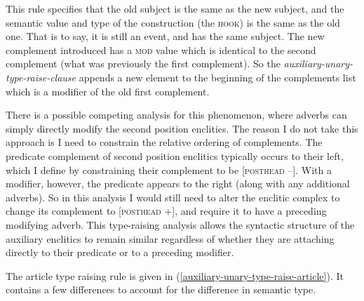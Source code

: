 \begin{singlespacing}
\ex \label{auxiliary-unary-type-raise-clause}
\xe
\end{singlespacing}

This rule specifies that the old subject is the same as the new subject, and the semantic value and type of the construction (the \textsc{hook}) is the same as the old one. That is to say, it is still an event, and has the same subject. The new complement introduced has a \textsc{mod} value which is identical to the second complement (what was previously the first complement). So the {\textit{auxiliary-unary-type-raise-clause}} appends a new element to the beginning of the complements list which is a modifier of the old first complement.

There is a possible competing analysis for this phenomenon, where adverbs can simply directly modify the second position enclitics. The reason I do not take this approach is I need to constrain the relative ordering of complements. The predicate complement of second position enclitics typically occurs to their left, which I define by constraining their complement to be [\textsc{posthead} --]. With a modifier, however, the predicate appears to the right (along with any additional adverbs). So in this analysis I would still need to alter the enclitic complex to change its complement to [\textsc{posthead} +], and require it to have a preceding modifying adverb. This type-raising analysis allows the syntactic structure of the auxiliary enclitics to remain similar regardless of whether they are attaching directly to their predicate or to a preceding modifier.

The article type raising rule is given in (\ref{auxiliary-unary-type-raise-article}). It contains a few differences to account for the difference in semantic type.

